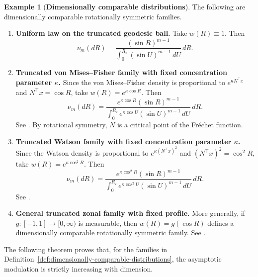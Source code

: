 \documentclass{amsart}
\theoremstyle{definition}
\newtheorem{expl}[theorem]{Example}
\theoremstyle{remark}
\newcommand\0{\boldsymbol{0}}
\begin{document}
\begin{expl}[\textbf{Dimensionally comparable distributions}]
The following are dimensionally comparable rotationally symmetric families.

\begin{enumerate}
\item \textbf{Uniform law on the truncated geodesic ball.}
Take \(w(R)\equiv 1\).  Then
\[
\nu_m(dR)=\frac{(\sin R)^{m-1}}{\int_{0}^{R_\varepsilon}(\sin U)^{m-1}\,dU}\,dR.
\]

\item \textbf{Truncated von Mises--Fisher family with fixed concentration parameter \(\kappa\).}
Since the von Mises--Fisher density is proportional to \(e^{\kappa N^\top x}\) and \(N^\top x=\cos R\), take \(w(R)=e^{\kappa\cos R}\).  Then
\[
\nu_m(dR)=\frac{e^{\kappa\cos R}(\sin R)^{m-1}}{\int_{0}^{R_\varepsilon} e^{\kappa\cos U}(\sin U)^{m-1}\,dU}\,dR.
\]
See \citet{JuppRegoliAzzalini2016}.  By rotational symmetry, \(N\) is a critical point of the Fr\'echet function.

\item \textbf{Truncated Watson family with fixed concentration parameter \(\kappa\).}
Since the Watson density is proportional to \(e^{\kappa(N^\top x)^2}\) and \((N^\top x)^2=\cos^2 R\), take \(w(R)=e^{\kappa\cos^2 R}\).  Then
\[
\nu_m(dR)=\frac{e^{\kappa\cos^2 R}(\sin R)^{m-1}}{\int_{0}^{R_\varepsilon} e^{\kappa\cos^2 U}(\sin U)^{m-1}\,dU}\,dR.
\]
See \citet{Watson1965,Mardia1975}.

\item \textbf{General truncated zonal family with fixed profile.}
More generally, if \(g:[-1,1]\to[0,\infty)\) is measurable, then \(w(R)=g(\cos R)\) defines a dimensionally comparable rotationally symmetric family.  See \citet{JuppRegoliAzzalini2016}.
\end{enumerate}
\end{expl}

The following theorem proves that, for the families in Definition~\ref{def:dimensionally-comparable-distributions}, the asymptotic modulation is strictly increasing with dimension.
\end{document}
